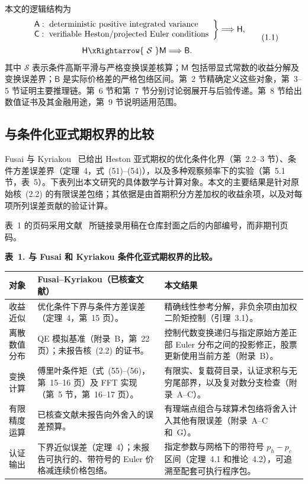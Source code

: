 本文的逻辑结构为
\[
\begin{gathered}
\left.
\begin{array}{l}
\mathsf A:\ \text{deterministic positive integrated variance}\\
\mathsf C:\ \text{verifiable Heston/projected Euler conditions}
\end{array}
\right\}\Longrightarrow\mathsf H,\\[4pt]
\mathsf H\xRightarrow{\ \mathcal S\ }\mathsf M\Longrightarrow\mathsf B .
\end{gathered}
\tag{1.1}
\]
其中 \(\mathcal S\) 表示条件高斯平滑与严格变换误差核算；\(\mathsf M\) 包括带显式常数的收益分解及变换误差界；\(\mathsf B\) 是实际价格差的严格包络区间。第~2 节精确定义这些对象，第~3--5 节证明主要推理链。第~6 节和第~7 节分别讨论弱展开与后验传递。第~8 节给出数值证书及其金融用途，第~9 节说明适用范围。


\subsection{与条件化亚式期权界的比较}


Fusai 与 Kyriakou~\cite{FusaiKyriakou2016} 已给出 Heston 亚式期权的优化条件化界（第~2.2--3 节）、条件方差误差界（定理~4，式~(51)--(54)），以及多种观察频率下的实验（第~5.1 节，表~5）。下表列出本文研究的具体数学与计算对象。本文的主要结果是针对原始核~(2.2) 的有限误差包络；其依据是由首期积分方差加权的收益余项，以及对每项所列误差贡献的验证计算。





表~1 的页码采用文献~\cite{FusaiKyriakou2016} 所链接录用稿在仓库封面之后的内部编号，而非期刊页码。

\noindent\textbf{表~1. 与 Fusai 和 Kyriakou 条件化亚式期权界的比较。}
\begin{tabularx}{\textwidth}{@{}p{}XX@{}}
\toprule
对象 & Fusai--Kyriakou（已核查文献） & 本文结果 \\
\midrule
收益近似 &
优化条件下界与条件方差误差（定理~4，第~15 页）。 &
精确线性参考分解，非负余项由加权二阶矩控制（引理~3.1）。 \\
\addlinespace
离散数值分布 &
QE 模拟基准（附录~B，第~22 页）；未报告核~(2.2) 的证书。 &
控制代数变换递归与指定原始方差正部 Euler 分布之间的投影修正，股票更新使用当前方差（附录~B）。 \\
\addlinespace
变换计算 &
傅里叶条件矩（式~(55)--(56)，第~15--16 页）及 FFT 实现（第~5 节，第~16--17 页）。 &
有限实、复载荷目录，认证求积与无穷尾部界，以及复对数分支检查（附录~A--C）。 \\
\addlinespace
有限精度运算 &
已核查文献未报告向外舍入的误差预算。 &
有理端点组合与球算术包络将舍入计入其他有限误差（附录~A--C 和~G）。 \\
\addlinespace
认证输出 &
下界近似误差（定理~4）；未报告可执行的、带符号的 Euler 价格减连续价格包络。 &
指定参数与网格下的带符号 \(p_h-p_c\) 区间（定理~4.1 和推论~4.2），可追溯至配套可执行程序包。 \\
\bottomrule
\end{tabularx}


